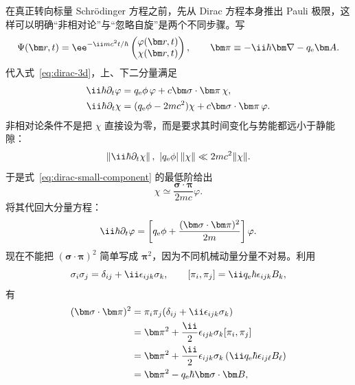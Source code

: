 在真正转向标量 Schr\"odinger 方程之前，先从 Dirac 方程本身推出 Pauli 极限，这样可以明确“非相对论”与“忽略自旋”是两个不同步骤。写
\begin{equation}
 \Psi(\bm r,t)=
 \ee^{-\ii mc^2t/\hbar}
 \begin{pmatrix}
 \varphi(\bm r,t)\\
 \chi(\bm r,t)
 \end{pmatrix},
 \qquad
 \bm\pi\equiv-\ii\hbar\bm\nabla-q_{\rm e}\bm A.
 \label{eq:dirac-nr-ansatz}
\end{equation}
代入式~\eqref{eq:dirac-3d}，上、下二分量满足
\begin{align}
 \ii\hbar\partial_t\varphi
 &=q_{\rm e}\phi\,\varphi+c\bm\sigma\cdot\bm\pi\,\chi,
 \label{eq:dirac-large-component}\\
 \ii\hbar\partial_t\chi
 &=(q_{\rm e}\phi-2mc^2)\chi
 +c\bm\sigma\cdot\bm\pi\,\varphi.
 \label{eq:dirac-small-component}
\end{align}
非相对论条件不是把 $\chi$ 直接设为零，而是要求其时间变化与势能都远小于静能隙：
\begin{equation}
 \left\|\ii\hbar\partial_t\chi\right\|,
 \ |q_{\rm e}\phi|\,\|\chi\|
 \ll 2mc^2\|\chi\|.
 \label{eq:small-component-adiabatic}
\end{equation}
于是式~\eqref{eq:dirac-small-component} 的最低阶给出
\begin{equation}
 \boxed{
 \chi\simeq\frac{\bm\sigma\cdot\bm\pi}{2mc}\varphi.}
 \label{eq:small-component-leading}
\end{equation}
将其代回大分量方程：
\begin{equation}
 \ii\hbar\partial_t\varphi
 =\left[
 q_{\rm e}\phi+
 \frac{(\bm\sigma\cdot\bm\pi)^2}{2m}
 \right]\varphi.
 \label{eq:pauli-before-square}
\end{equation}
现在不能把 $(\bm\sigma\cdot\bm\pi)^2$ 简单写成 $\bm\pi^2$，因为不同机械动量分量不对易。利用
\begin{equation}
 \sigma_i\sigma_j=\delta_{ij}+\ii\epsilon_{ijk}\sigma_k,
 \qquad
 [\pi_i,\pi_j]=\ii q_{\rm e}\hbar\epsilon_{ijk}B_k,
\end{equation}
有
\begin{align}
(\bm\sigma\cdot\bm\pi)^2
&=\pi_i\pi_j(\delta_{ij}+\ii\epsilon_{ijk}\sigma_k)\\
&=\bm\pi^2
+\frac{\ii}{2}\epsilon_{ijk}\sigma_k[\pi_i,\pi_j]\\
&=\bm\pi^2
+\frac{\ii}{2}\epsilon_{ijk}\sigma_k
\left(\ii q_{\rm e}\hbar\epsilon_{ij\ell}B_\ell\right)\\
&=\bm\pi^2-q_{\rm e}\hbar\bm\sigma\cdot\bm B,
 \label{eq:sigma-pi-square-pauli}
\end{align}
